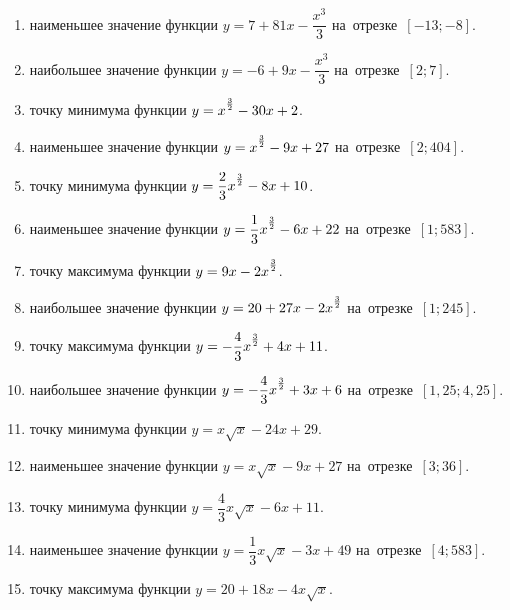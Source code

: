 \documentclass[a4paper,10pt]{article}
\begin{document}
\begin{enumerate}
\item {} наименьшее значение функции $y=7 +81x-\dfrac{x^3}{3}$ на~отрезке~$\left[-13;-8\right]$.

\item {} наибольшее значение функции $y=-6 +9x-\dfrac{x^3}{3}$ на~отрезке~$\left[2;7\right]$.

\item {} точку минимума функции $y=x\strut^{\frac{3}{2}} -30x+2$.

\item {} наименьшее значение функции $y=x\strut^{\frac{3}{2}} -9x+27$ на~отрезке~$\left[2;404\right]$.

\item {} точку минимума функции $y=\dfrac{2}{3}x\strut^{\frac{3}{2}} -8x+10$.

\item {} наименьшее значение функции $y=\dfrac{1}{3}x\strut^{\frac{3}{2}} -6x+22$ на~отрезке~$\left[1;583\right]$.

\item {} точку максимума функции $y=9x-2x\strut^{\frac{3}{2}}$.

\item {} наибольшее значение функции $y=20+27x-2x\strut^{\frac{3}{2}}$ на~отрезке~$\left[1;245\right]$.

\item {} точку максимума функции $y=-\dfrac{4}{3}x\strut^{\frac{3}{2}} +4x+11$.

\item {} наибольшее значение функции $y=-\dfrac{4}{3}x\strut^{\frac{3}{2}} +3x+6$ на~отрезке~$\left[1,25;4,25\right]$.

\item {} точку минимума функции $y=x\sqrt{x} -24x+29$.

\item {} наименьшее значение функции $y=x\sqrt{x} -9x+27$ на~отрезке~$\left[3;36\right]$.

\item {} точку минимума функции $y=\dfrac{4}{3}x\sqrt{x} -6x+11$.

\item {} наименьшее значение функции $y=\dfrac{1}{3}x\sqrt{x} -3x+49$ на~отрезке~$\left[4;583\right]$.

\item {} точку максимума функции $y=20+18x -4x\sqrt{x}$.


\end{enumerate}
\end{document}
